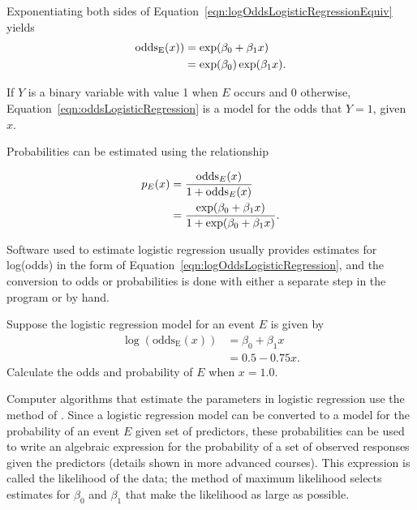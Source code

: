 Exponentiating both sides of Equation~\ref{eqn:logOddsLogisticRegressionEquiv} yields
\begin{align}
  \text{odds}_\text{E}(x)) &= \exp(\beta_0 + \beta_1 x) \notag \\
  &= \exp(\beta_0) \exp(\beta_1 x).
    \label{eqn:oddsLogisticRegression}
\end{align}

If $Y$ is a binary variable with value 1 when $E$ occurs and 0 otherwise,
Equation~\ref{eqn:oddsLogisticRegression} is a model for the odds that $Y = 1$, given $x$.

Probabilities can be estimated using the relationship 

\begin{align}
  p_{E}(x) &= \frac{\text{odds}_{E}(x)}{1 + \text{odds}_{E}(x)} \notag \\
        &= \frac{\exp(\beta_0 + \beta_1 x)}
        {1 + \exp(\beta_0 + \beta_1 x)}.
        \label{eqn:probLogisticRegression}
 \end{align}

Software used to estimate logistic regression usually provides estimates for log(odds) in the form of Equation~\ref{eqn:logOddsLogisticRegression}, and the conversion to odds or probabilities is done with either a separate step in the program or by hand.

\begin{exercisewrap}
  \begin{nexercise}\label{guidedPracticeSimpleModel} 
Suppose the logistic regression model for an event $E$ is given by
\begin{align*}
\log(\text{odds}_\text{E}(x)) &= \beta_0 + \beta_1 x \\
             &= 0.5 - 0.75x.
\end{align*}
Calculate the odds and probability of $E$ when $x = 1.0$.
\footnotemark{}
\end{nexercise}
\end{exercisewrap}

Computer algorithms that estimate the parameters in logistic regression use the method of .  Since a logistic regression model can be converted to a model for the probability of an event $E$ given set of predictors, these probabilities can be used to write an algebraic expression for the probability of a set of observed responses given the predictors (details shown in more advanced courses).  This expression is called the likelihood of the data; the method of maximum likelihood selects estimates for $\beta_0$ and $\beta_1$ that make the likelihood as large as possible.

